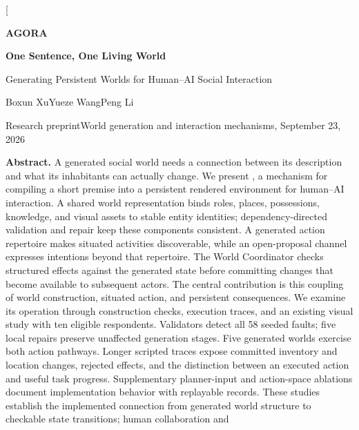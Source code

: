 \documentclass[10pt,twocolumn]{article}
\begin{document}
\twocolumn[{
\begin{center}
{\color{agorateal}\sffamily\bfseries\fontsize{26}{28}\selectfont AGORA}\par
\vspace{3pt}
{\bfseries\fontsize{21}{24}\selectfont One Sentence, One Living World}\par
\vspace{5pt}
{\large Generating Persistent Worlds for Human--AI Social Interaction}\par
\vspace{9pt}
{\normalsize Boxun Xu\qquad Yueze Wang\qquad Peng Li}\par
\vspace{3pt}
{\small\color{agoragray}Research preprint\quad\textbullet\quad World generation and interaction mechanisms, September 23, 2026}\par
\end{center}
\vspace{3pt}
\begin{minipage}{\textwidth}
\small
\noindent\textbf{Abstract.}
A generated social world needs a connection between its description and
what its inhabitants can actually change. We present \agora, a mechanism
for compiling a short premise into a persistent rendered environment for
human--AI interaction. A shared world representation binds roles, places,
possessions, knowledge, and visual assets to stable entity identities;
dependency-directed validation and repair keep these components consistent.
A generated action repertoire makes situated activities discoverable, while
an open-proposal channel expresses intentions beyond that repertoire. The
World Coordinator checks structured effects against the generated state
before committing changes that become available to subsequent actors.
The central contribution is this coupling of world construction, situated
action, and persistent consequences. We examine its operation through
construction checks, execution traces, and an existing visual study with
ten eligible respondents. Validators detect all 58 seeded faults; five
local repairs preserve unaffected generation stages. Five generated worlds
exercise both action pathways. Longer scripted traces expose committed
inventory and location changes, rejected effects, and the distinction between
an executed action and useful task progress. Supplementary planner-input and
action-space ablations document implementation behavior with replayable
records. These studies establish the implemented connection from generated
world structure to checkable state transitions; human collaboration and

\end{minipage}}
\end{document}
